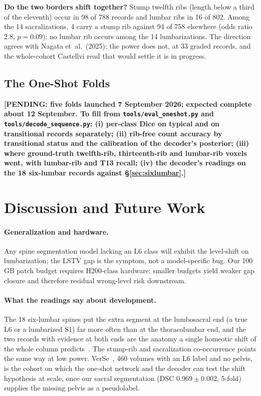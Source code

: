 \documentclass{article}
\newcommand{\VerSe}{VerSe}
\begin{document}
\textbf{Do the two borders shift together?} Stump twelfth
ribs (length below a third of the eleventh) occur in 98 of
788 records and lumbar ribs in 16 of 802. Among the 14
sacralizations, 4 carry a stump rib against 94 of 758
elsewhere (odds ratio 2.8, $p{=}0.09$); no lumbar rib
occurs among the 14 lumbarizations. The direction agrees
with Nagata et~al.\ (2025); the power does not, at 33
graded records, and the whole-cohort Castellvi read that
would settle it is in progress.

\subsection{The One-Shot Folds}
\label{sec:oneshot-results}

\textbf{[PENDING: five folds launched 7 September 2026;
expected complete about 12 September. To fill from
\texttt{tools/eval\_oneshot.py} and
\texttt{tools/decode\_sequence.py}: (i) per-class Dice on
typical and on transitional records separately; (ii)
rib-free count accuracy by transitional status and the
calibration of the decoder's posterior; (iii) where
ground-truth twelfth-rib, thirteenth-rib and lumbar-rib
voxels went, with lumbar-rib and T13 recall; (iv) the
decoder's readings on the 18 six-lumbar records against
\S\ref{sec:sixlumbar}.]}

\section{Discussion and Future Work}
\label{sec:discussion}

\paragraph{Generalization and hardware.}
Any spine segmentation model lacking an L6 class will
exhibit the level-shift on lumbarization; the LSTV gap is
the symptom, not a model-specific bug. Our 100\,GB patch
budget requires H200-class hardware; smaller budgets yield
weaker gap closure and therefore residual wrong-level risk
downstream.

\paragraph{What the readings say about development.}
The 18 six-lumbar spines put the extra segment at the
lumbosacral end (a true L6 or a lumbarized S1) far more
often than at the thoracolumbar end, and the two records
with evidence at both ends are the anatomy a single
homeotic shift of the whole column
predicts~\citep{DuPlessis2018Homeotic,Poolman2023TransitionalVertebrae}.
The stump-rib and sacralization co-occurrence points the
same way at low power. \VerSe{}~\citep{Sekuboyina2021VerSe:Images},
460 volumes with an L6 label and no pelvis, is the
cohort on which the one-shot network and the decoder can
test the shift hypothesis at scale, once our sacral
segmentation (DSC $0.969 \pm 0.002$, 5-fold) supplies the
missing pelvis as a pseudolabel.
\end{document}
